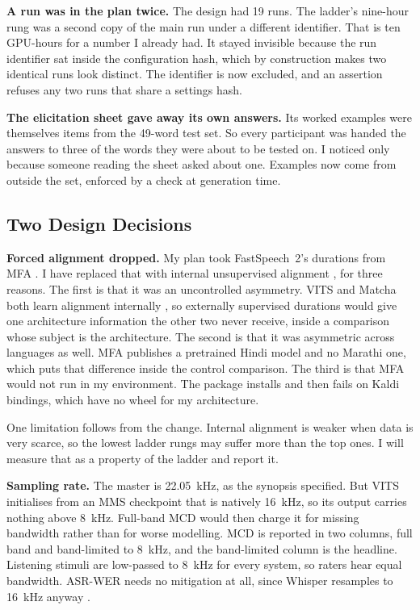 \documentclass[12pt,a4paper]{article}
\begin{document}
\textbf{A run was in the plan twice.} The design had 19 runs. The ladder's
nine-hour rung was a second copy of the main run under a different identifier.
That is ten GPU-hours for a number I already had. It stayed invisible because
the run identifier sat inside the configuration hash, which by construction
makes two identical runs look distinct. The identifier is now excluded, and an
assertion refuses any two runs that share a settings hash.

\textbf{The elicitation sheet gave away its own answers.} Its worked examples
were themselves items from the 49-word test set. So every participant was
handed the answers to three of the words they were about to be tested on. I
noticed only because someone reading the sheet asked about one. Examples now come from outside the
set, enforced by a check at generation time.

\subsection{Two Design Decisions}

\textbf{Forced alignment dropped.} My plan took FastSpeech~2's durations from
MFA \cite{mcauliffe2017mfa}. I have replaced that with internal unsupervised
alignment \cite{badlani2022alignment}, for three reasons. The first is that it
was an uncontrolled asymmetry. VITS and Matcha both learn alignment internally
\cite{kim2020glowtts}, so externally supervised durations would give one
architecture information the other two never receive, inside a comparison whose
subject is the architecture. The second is that it was asymmetric across
languages as well. MFA publishes a pretrained Hindi model and no Marathi one,
which puts that difference inside the control comparison. The third is that MFA
would not run in my environment. The package installs and then fails on Kaldi
bindings, which have no wheel for my architecture.

One limitation follows from the change. Internal alignment is weaker when data
is very scarce, so the lowest ladder rungs may suffer more than the top ones. I
will measure that as a property of the ladder and report it.

\textbf{Sampling rate.} The master is 22.05~kHz, as the synopsis specified.
But VITS initialises from an MMS checkpoint \cite{pratap2024mms} that is
natively 16~kHz, so its output carries nothing above 8~kHz. Full-band MCD would
then charge it for missing bandwidth rather than for worse modelling. MCD is reported in two columns, full band and band-limited to
8~kHz, and the band-limited column is the headline. Listening stimuli are
low-passed to 8~kHz for every system, so raters hear equal bandwidth. ASR-WER
needs no mitigation at all, since Whisper resamples to 16~kHz anyway
\cite{radford2023whisper}.
\end{document}
